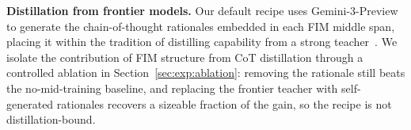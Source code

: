 \textbf{Distillation from frontier models.}
Our default recipe uses Gemini-3-Preview to generate the chain-of-thought
rationales embedded in each FIM middle span, placing it within the
tradition of distilling capability from a strong teacher~\citep{orca,
selfinstruct, distillwhisper}. We isolate the contribution of FIM
structure from CoT distillation through a controlled ablation in
Section~\ref{sec:exp:ablation}: removing the rationale still beats the
no-mid-training baseline, and replacing the frontier teacher with
self-generated rationales recovers a sizeable fraction of the gain, so
the recipe is not distillation-bound.
